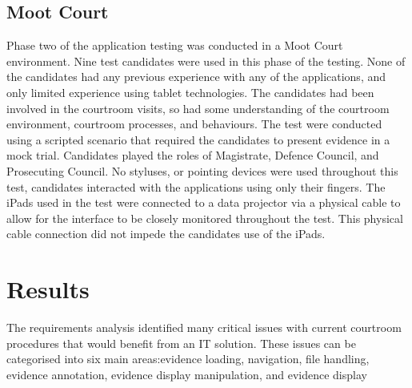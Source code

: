 \documentclass{article}
\begin{document}
\subsection{Moot Court}
Phase two of the application testing was conducted in a Moot Court environment. Nine test candidates were used in this phase of the testing. None of the candidates had any previous experience with any of the applications, and only limited experience using tablet technologies. The candidates had been involved in the courtroom visits, so had some understanding of the courtroom environment, courtroom processes, and behaviours. The test were conducted using a scripted scenario that required the candidates to present evidence in a mock trial. Candidates played the roles of Magistrate, Defence Council, and Prosecuting Council. No styluses, or pointing devices were used throughout this test, candidates interacted with the applications using only their fingers. The iPads used in the test were connected to a data projector via a physical cable to allow for the interface to be closely monitored throughout the test. This physical cable connection did not impede the candidates use of the iPads.

\section{Results}
The requirements analysis identified many critical issues with current courtroom procedures that would benefit from an IT solution. These issues can be categorised into six main areas:evidence loading, navigation, file handling, evidence annotation, evidence display manipulation, and evidence display
\end{document}
